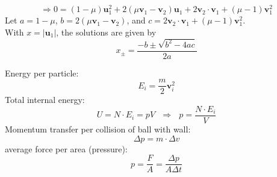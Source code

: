 \documentclass[11 pt]{article}
\begin{document}
    \begin{equation}
        \Rightarrow0
        =(1-\mu)\textbf{u}_1^2
        +2(\mu\textbf{v}_1-\textbf{v}_2)\textbf{u}_1
        +2\textbf{v}_2\cdot\textbf{v}_1+(\mu-1)\textbf{v}_1^2
    \end{equation}
    Let $a=1-\mu$, $b=2(\mu\textbf{v}_1-\textbf{v}_2)$, and
    $c=2\textbf{v}_2\cdot\textbf{v}_1+(\mu-1)\textbf{v}_1^2$. \\
    With $x=|\textbf{u}_1|$, the solutions are given by 
    \begin{equation}
        x_{\pm}=\frac{-b\pm\sqrt{b^2-4ac}}{2a}
        \label{}
    \end{equation}

    \newpage \noindent
    Energy per particle:
    \begin{equation}
        E_i=\frac{m}{2}\textbf{v}_i^2
    \end{equation}
    Total internal energy:
    \begin{equation}
        U=N\cdot E_i=pV\ \ \ \Rightarrow\ \ \ p=\frac{N\cdot E_i}{V}
    \end{equation}
    Momentum transfer per collision of ball with wall:
    \begin{equation}
        \Delta p=m\cdot \Delta v
    \end{equation}
    average force per area (pressure):
    \begin{equation}
        p=\frac{F}{A}=\frac{\Delta p}{A\Delta t}
        \label{}
    \end{equation}
\end{document}
